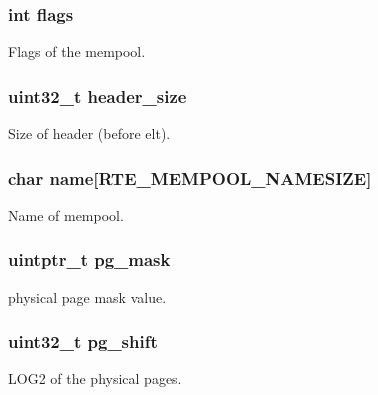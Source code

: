 \subsubsection[{flags}]{\setlength{\rightskip}{0pt plus 5cm}int flags}\label{structrte__mempool_ac8bf36fe0577cba66bccda3a6f7e80a4}
Flags of the mempool. \hypertarget{structrte__mempool_a841923a20e6dda97c59351c8e97c9be6}{}
\subsubsection[{header\+\_\+size}]{\setlength{\rightskip}{0pt plus 5cm}uint32\+\_\+t header\+\_\+size}\label{structrte__mempool_a841923a20e6dda97c59351c8e97c9be6}
Size of header (before elt). \hypertarget{structrte__mempool_aa9d929fcb7038a3fec6da7bae3853aab}{}
\subsubsection[{name}]{\setlength{\rightskip}{0pt plus 5cm}char name\mbox{[}{\bf R\+T\+E\+\_\+\+M\+E\+M\+P\+O\+O\+L\+\_\+\+N\+A\+M\+E\+S\+I\+Z\+E}\mbox{]}}\label{structrte__mempool_aa9d929fcb7038a3fec6da7bae3853aab}
Name of mempool. \hypertarget{structrte__mempool_afae806f0ec59fb49b1578f20cd5aebbf}{}
\subsubsection[{pg\+\_\+mask}]{\setlength{\rightskip}{0pt plus 5cm}uintptr\+\_\+t pg\+\_\+mask}\label{structrte__mempool_afae806f0ec59fb49b1578f20cd5aebbf}
physical page mask value. \hypertarget{structrte__mempool_accb972310b9ffe52e66fb51b699eb2d6}{}
\subsubsection[{pg\+\_\+shift}]{\setlength{\rightskip}{0pt plus 5cm}uint32\+\_\+t pg\+\_\+shift}\label{structrte__mempool_accb972310b9ffe52e66fb51b699eb2d6}
L\+O\+G2 of the physical pages. \hypertarget{structrte__mempool_a3901f538726d14b9ad14e0bd7578c959}{}

